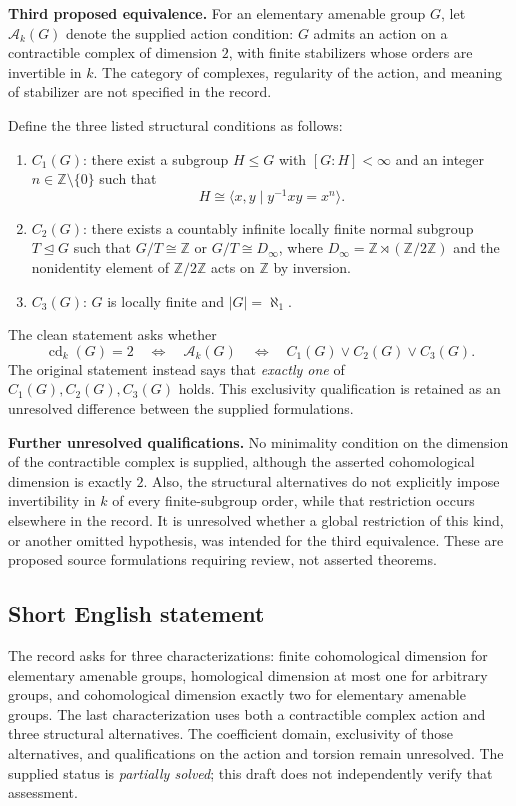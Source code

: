 \documentclass[11pt]{article}
\newcommand{\Z}{\mathbb{Z}}
\begin{document}
\textbf{Third proposed equivalence.} For an elementary amenable group \(G\), let \(\mathcal A_k(G)\) denote the supplied action condition: \(G\) admits an action on a contractible complex of dimension \(2\), with finite stabilizers whose orders are invertible in \(k\). The category of complexes, regularity of the action, and meaning of stabilizer are not specified in the record.

Define the three listed structural conditions as follows:
\begin{enumerate}
\item \(C_1(G)\): there exist a subgroup \(H\leq G\) with \([G:H]<\infty\) and an integer \(n\in\Z\setminus\{0\}\) such that
\[
H\cong\langle x,y\mid y^{-1}xy=x^n\rangle.
\]
\item \(C_2(G)\): there exists a countably infinite locally finite normal subgroup \(T\trianglelefteq G\) such that \(G/T\cong\Z\) or \(G/T\cong D_\infty\), where \(D_\infty=\Z\rtimes(\Z/2\Z)\) and the nonidentity element of \(\Z/2\Z\) acts on \(\Z\) by inversion.
\item \(C_3(G)\): \(G\) is locally finite and \(|G|=\aleph_1\).
\end{enumerate}
The clean statement asks whether
\[
\operatorname{cd}_k(G)=2
\quad\Longleftrightarrow\quad\mathcal A_k(G)
\quad\Longleftrightarrow\quad
C_1(G)\lor C_2(G)\lor C_3(G).
\]
The original statement instead says that \emph{exactly one} of \(C_1(G),C_2(G),C_3(G)\) holds. This exclusivity qualification is retained as an unresolved difference between the supplied formulations.

\textbf{Further unresolved qualifications.} No minimality condition on the dimension of the contractible complex is supplied, although the asserted cohomological dimension is exactly \(2\). Also, the structural alternatives do not explicitly impose invertibility in \(k\) of every finite-subgroup order, while that restriction occurs elsewhere in the record. It is unresolved whether a global restriction of this kind, or another omitted hypothesis, was intended for the third equivalence. These are proposed source formulations requiring review, not asserted theorems.
\subsection{Short English statement}
The record asks for three characterizations: finite cohomological dimension for elementary amenable groups, homological dimension at most one for arbitrary groups, and cohomological dimension exactly two for elementary amenable groups. The last characterization uses both a contractible complex action and three structural alternatives. The coefficient domain, exclusivity of those alternatives, and qualifications on the action and torsion remain unresolved. The supplied status is \emph{partially solved}; this draft does not independently verify that assessment.
\end{document}
